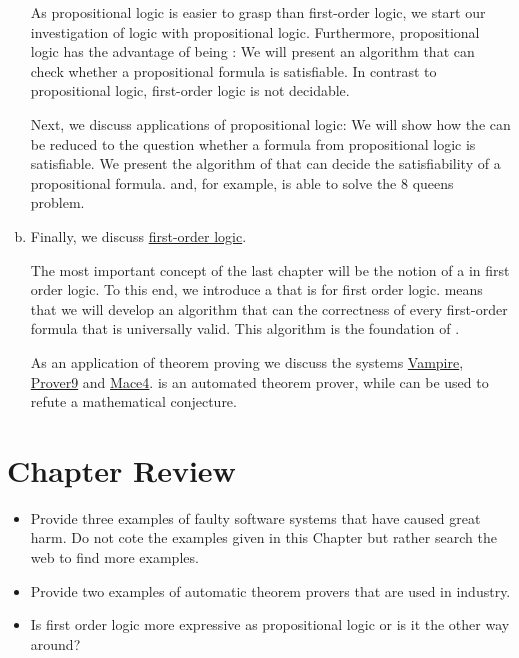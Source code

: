 \begin{enumerate}[(a)]
      As propositional logic is easier to grasp than first-order logic, we start our investigation
      of logic with propositional logic.  Furthermore, propositional logic has the advantage of
      being :  We will present an algorithm that can check whether a propositional formula
      is satisfiable.  In contrast to propositional logic, first-order logic is not decidable.

      Next, we discuss applications of propositional logic:  We will show how the  
      can be reduced to the question whether a formula from propositional logic is satisfiable.  We present
      the algorithm of  that can decide the satisfiability of a propositional formula.
      and, for example, is able to solve the 8 queens problem.  
\item Finally, we discuss \href{https://en.wikipedia.org/wiki/First-order_logic}{first-order logic}.

      The most important concept of the last chapter will be the notion of a  in
      first order logic.  To this end, we introduce a  that is
       for first order logic.   means that we will develop an
      algorithm that can  the correctness of every first-order formula that is
      universally valid.  This algorithm is the foundation of .

      As an application of theorem proving we discuss the systems \href{https://vprover.github.io/}{Vampire},
      \href{https://www.cs.unm.edu/~mccune/mace4/}{Prover9} and
      \href{https://www.cs.unm.edu/~mccune/mace4/}{Mace4}.  is an automated theorem prover, while
       can be used to refute a mathematical conjecture.
\end{enumerate}

\section{Chapter Review}
\begin{itemize}
\item Provide three examples of faulty software systems that have caused great harm.
      Do not cote the examples given in this Chapter but rather search the web to find more examples.
\item Provide two examples of automatic theorem provers that are used in industry.
\item Is first order logic more expressive as propositional logic or is it the other way around?
\end{itemize}


